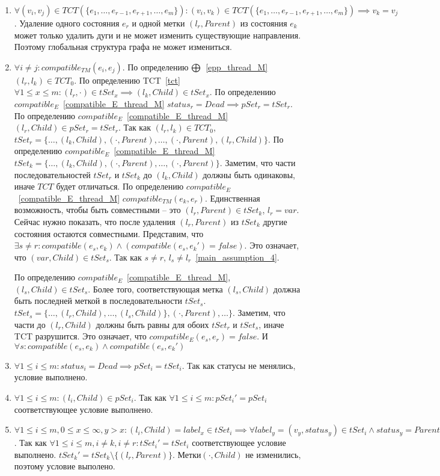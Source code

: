 \begin{enumerate}
\item $\forall (v_i, v_j) \in TCT(\{e_1, \dots, e_{r-1}, e_{r+1}, \dots, e_m\}): (v_i, v_k) \in TCT(\{e_1, \dots, e_{r-1}, e_{r+1}, \dots, e_m\}) \implies v_k = v_j$.
Удаление одного состояния $e_r$ и одной метки $(l_r, Parent)$ из состояния $e_k$ может только удалить дуги и не может изменить существующие направления. Поэтому глобальная структура графа не может измениться.
\item $\forall i \neq j: compatible_{TM}(e_i, e_j)$.
По определению $\mathrel{\bigoplus}$~\ref{epp_thread_M} $(l_r, l_k) \in TCT_0$.
По определению TCT~\ref{tct} $\forall 1 \le x \le m: (l_r, \cdot) \in tSet_x \implies (l_k, Child) \in tSet_x$.
По определению $compatible_E$~\ref{compatible_E_thread_M} $status_r = Dead \implies pSet_r = tSet_r$.
По определению $compatible_E$~\ref{compatible_E_thread_M} $(l_r, Child) \in pSet_r = tSet_r$.
Так как $(l_r, l_k) \in TCT_0$, $tSet_r = \{\dots, (l_k, Child), (\cdot, Parent), \dots, (\cdot, Parent), (l_r, Child)\}$.
По определению $compatible_E$~\ref{compatible_E_thread_M} $tSet_k = \{\dots, (l_k, Child), (\cdot, Parent), \dots, (\cdot, Parent)\}$.
Заметим, что части последовательностей $tSet_r$ и $tSet_k$ до $(l_k, Child)$ должны быть одинаковы, иначе $TCT$ будет отличаться.
По определению $compatible_E$~\ref{compatible_E_thread_M} $compatible_{TM}(e_k, e_r)$.
Единственная возможность, чтобы быть совместными -- это $(l_r, Parent) \in tSet_k$, $l_r = var$.
Сейчас нужно показать, что после удаления $(l_r, Parent)$ из $tSet_k$ другие состояния остаются совместными.
Представим, что $\exists s \neq r: compatible(e_s, e_k) \land (compatible(e_s, e_k') = false)$. 
Это означает, что $(var, Child) \in tSet_s$. Так как $s \neq r$, $l_s \neq l_r$~\ref{main_assumption_4}.

По определению $compatible_E$~\ref{compatible_E_thread_M}, $(l_s, Child) \in tSet_s$.
Более того, соответствующая метка $(l_s, Child)$ должна быть последней меткой в последовательности $tSet_s$.
$tSet_s = \{\dots, (l_r, Child), \dots, (l_s, Child)\}, (\cdot, Parent), \dots\}$.
Заметим, что части до $(l_r, Child)$ должны быть равны для обоих $tSet_r$ и $tSet_s$, иначе TCT разрушится.
Это означает, что $compatible_E(e_s, e_r) = false$.
И $\forall s: compatible(e_s, e_k) \land compatible(e_s, e_k')$
\item $\forall 1 \le i \le m: status_i = Dead \implies pSet_i = tSet_i$.
Так как статусы не менялись, условие выполнено.
\item $\forall 1 \le i \le m: (l_i, Child) \in pSet_i$.
Так как $\forall 1 \le i \le m: pSet_i' = pSet_i$ соответствующее условие выполнено.
\item $\forall 1 \le i \le m, 0 \le x \le \infty, y > x: (l_i, Child) = label_x \in tSet_i \implies  \forall label_y = (v_y, status_y) \in tSet_i \land status_y = Parent$.
Так как $\forall 1 \le i \le m, i \neq k, i \neq r: tSet_i' = tSet_i$ соответствующее условие выполнено.
$tSet_k' = tSet_k \setminus \{(l_r, Parent)\}$. Метки$(\cdot, Child)$ не изменились, поэтому условие выполено.
\end{enumerate}

